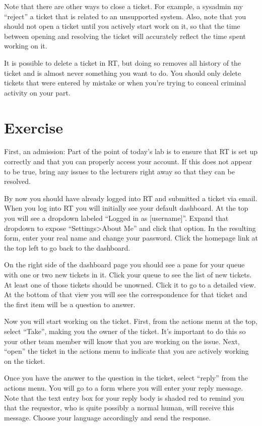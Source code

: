 \documentclass{article}
\begin{document}
Note that there are other ways to close a ticket. For example, a sysadmin my ``reject'' a ticket that is related to an unsupported system. Also, note that you should not open a ticket until you actively start work on it, so that the time between opening and resolving the ticket will accurately reflect the time spent working on it.

It is possible to delete a ticket in RT, but doing so removes all history of the ticket and is almost never something you want to do. You should only delete tickets that were entered by mistake or when you're trying to conceal criminal activity on your part.

\section{Exercise}
First, an admission: Part of the point of today's lab is to ensure that RT is set up correctly and that you can properly access your account. If this does not appear to be true, bring any issues to the lecturers right away so that they can be resolved.

By now you should have already logged into RT and submitted a ticket via email. When you log into RT you will initially see your default dashboard. At the top you will see a dropdown labeled ``Logged in as [username]''. Expand that dropdown to expose ``Settings>About Me'' and click that option. In the resulting form, enter your real name and change your password. Click the homepage link at the top left to go back to the dashboard.

On the right side of the dashboard page you should see a pane for your queue with one or two new tickets in it. Click your queue to see the list of new tickets. At least one of those tickets should be unowned. Click it to go to a detailed view. At the bottom of that view you will see the correspondence for that ticket and the first item will be a question to answer.

Now you will start working on the ticket. First, from the actions menu at the top, select ``Take'', making you the owner of the ticket. It's important to do this so your other team member will know that you are working on the issue. Next, ``open'' the ticket in the actions menu to indicate that you are actively working on the ticket.

Once you have the answer to the question in the ticket, select ``reply'' from the actions menu. You will go to a form where you will enter your reply message. Note that the text entry box for your reply body is shaded red to remind you that the requestor, who is quite possibly a normal human, will receive this message. Choose your language accordingly and send the response.
\end{document}

